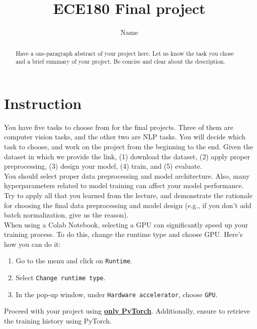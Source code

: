 \documentclass{article}
\title{ECE180 Final project}
\author{Name}
\begin{document}
\maketitle


\begin{abstract}
    Have a one-paragraph abstract of your project here. Let us know the task you chose and a brief summary of your project. Be concise and clear about the description. 
\end{abstract}


\section{Instruction}
You have five tasks to choose from for the final projects.
Three of them are computer vision tasks, and the other two are NLP tasks.
You will decide which task to choose, and work on the project from the beginning to the end.
Given the dataset in which we provide the link, (1) download the dataset, (2) apply proper preprocessing, (3) design your model, (4) train, and (5) evaluate. \\

You should select proper data preprocessing and model architecture.
Also, many hyperparameters related to model training can affect your model performance. \\

Try to apply all that you learned from the lecture, and demonstrate the rationale for choosing the final data preprocessing and model design (e.g., if you don't add batch normalization, give us the reason). \\

When using a Colab Notebook, selecting a GPU can significantly speed up your training process. To do this, change the runtime type and choose GPU. 
Here's how you can do it:
\begin{center}
\begin{enumerate}
    \item Go to the menu and click on \texttt{Runtime}.
    \item Select \texttt{Change runtime type}.
    \item In the pop-up window, under \texttt{Hardware accelerator}, choose \texttt{GPU}.
\end{enumerate}
\end{center}
Proceed with your project using \textbf{\underline{only PyTorch}}. Additionally, ensure to retrieve the training history using PyTorch.
\end{document}
